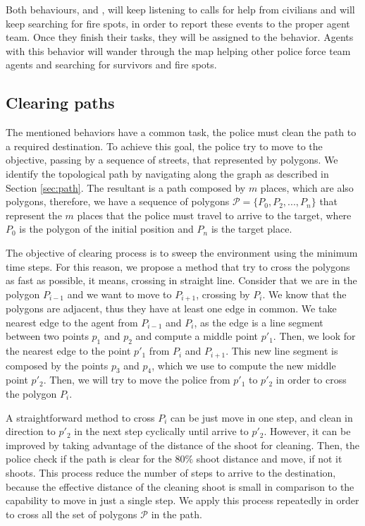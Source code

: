 Both behaviours,  and , will keep listening to calls for help from civilians and will keep searching for fire spots, in order to report these events to the proper agent team. Once they finish their tasks, they will be assigned to the  behavior. Agents with this behavior will wander through the map helping other police force team agents and searching for survivors and fire spots.

\subsection{Clearing paths}
The mentioned behaviors have a common task, the police must clean the path to a required destination.
To achieve this goal, the police try to move to the objective, passing by a sequence of streets, that represented by polygons. We identify the topological path by navigating along the graph as described in Section \ref{sec:path}. The resultant is a path composed by $m$ places, which are also polygons, therefore, we have a sequence of polygons $\mathcal{P} = \{P_0, P_2, ..., P_n \}$ that represent the $m$ places that the police must travel to arrive to the target, where $P_0$ is the polygon of the initial position and $P_n$ is the target place.

The objective of clearing process is to sweep the environment using the minimum time steps.
For this reason, we propose a method that try to cross the polygons as fast as possible, it means, crossing in straight line.
Consider that we are in the polygon $P_{i-1}$ and we want to move to  $P_{i+1}$, crossing by  $P_{i}$.
We know that the polygons are adjacent, thus they have at least one edge in common.
We take nearest edge to the agent from $P_{i-1}$ and $P_{i}$, as the edge is a line segment between two points $p_1$ and $p_2$ and compute a middle point $p'_1$.
Then, we look for the nearest edge to the point $p'_1$ from $P_{i}$ and $P_{i+1}$. This new line segment is composed by the points $p_3$ and $p_4$, which we use to compute the new middle point $p'_2$. Then, we will try to move the police from  $p'_1$ to $p'_2$ in order to cross the polygon $P_{i}$.

A straightforward method to cross $P_{i}$ can be just move in one step, and clean in direction to $p'_2$ in the next step cyclically until arrive to $p'_2$. However,
it can be improved by taking advantage of the distance of the shoot for cleaning.
Then, the police check if the path is clear for the $80\%$ shoot distance and move, if not it shoots. This process reduce the number of steps to arrive to the destination, because the effective distance of the cleaning shoot is small in comparison to the capability to move in just a single step.
We apply this process repeatedly in order to cross all the set of polygons $\mathcal{P}$ in the path.


